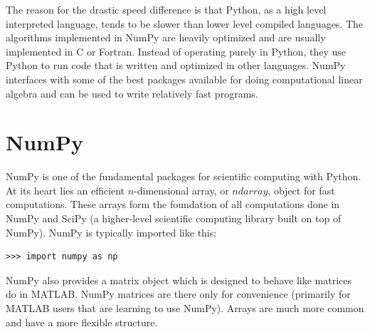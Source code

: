 %

The reason for the drastic speed difference is that Python, as a high level interpreted language, tends to be slower than lower level compiled languages.
The algorithms implemented in NumPy are heavily optimized and are usually implemented in C or Fortran.
Instead of operating purely in Python, they use Python to run code that is written and optimized in other languages.
NumPy interfaces with some of the best packages available for doing computational linear algebra and can be used to write relatively fast programs.


\section*{NumPy}
NumPy is one of the fundamental packages for scientific computing with Python.
At its heart lies an efficient $n$-dimensional array, or $ndarray$, object for fast computations.
These arrays form the foundation of all computations done in NumPy and SciPy (a higher-level scientific computing library built on top of NumPy).
NumPy is typically imported like this:
\begin{lstlisting}
>>> import numpy as np
\end{lstlisting}
NumPy also provides a matrix object which is designed to behave like matrices do in MATLAB.
NumPy matrices are there only for convenience (primarily for MATLAB users that are learning to use NumPy).
Arrays are much more common and have a more flexible structure.

